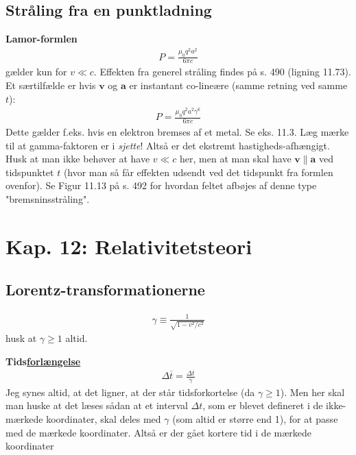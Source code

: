 \documentclass[a4paper]{article}
\begin{document}
    \subsection{Stråling fra en punktladning}
    \textbf{Lamor-formlen}
    \begin{align*}
        \boxed{P = \frac{\mu _0 q^2 a^2}{6 \pi  c}} \tag{11.70}
    \end{align*} 
    gælder kun for \(v \ll c\). Effekten fra generel stråling findes på s. 490 (ligning 11.73). Et særtilfælde er hvis \(\mathbf{v}\) og \(\mathbf{a}\) er instantant co-lineære (samme retning ved samme \(t\)): \begin{align*}
        P = \frac{\mu _0 q^{2} a^{2} \gamma ^6}{6 \pi c}
    \end{align*}  
    Dette gælder f.eks. hvis en elektron bremses af et metal. Se eks. 11.3. Læg mærke til at gamma-faktoren er i \textit{sjette}! Altså er det ekstremt hastigheds-afhængigt. Husk at man ikke behøver at have \(v \ll c\) her, men at man skal have \(\mathbf{v} \parallel \mathbf{a}\) ved tidspunktet \(t\) (hvor man så får effekten udsendt ved det tidspunkt fra formlen ovenfor). Se Figur 11.13 på s. 492 for hvordan feltet afbøjes af denne type "bremsninsstråling".    

    \newpage
    \section{Kap. 12: Relativitetsteori}
    \textbf{} 
    \subsection{Lorentz-transformationerne}
    \begin{align*}
        \boxed{\gamma \equiv \frac{1}{\sqrt{1 - v^{2} /c^{2} } }} \tag{12.6}
    \end{align*}
    husk at \(\gamma \geq 1\) altid. 
    
    \textbf{Tids\underline{forlængelse}} 
    \begin{align*}
        \Delta \overline{t} = \frac{\Delta t}{\gamma} \tag{12.5}
    \end{align*}
    Jeg synes altid, at det ligner, at der står tidsforkortelse (da \(\gamma \geq 1\)). Men her skal man huske at det læses sådan at et interval \(\Delta t\), som er blevet defineret i de ikke-mærkede koordinater, skal deles med \(\gamma\) (som altid er større end 1), for at passe med de mærkede koordinater. Altså er der gået kortere tid i de mærkede koordinater
    
\end{document}
